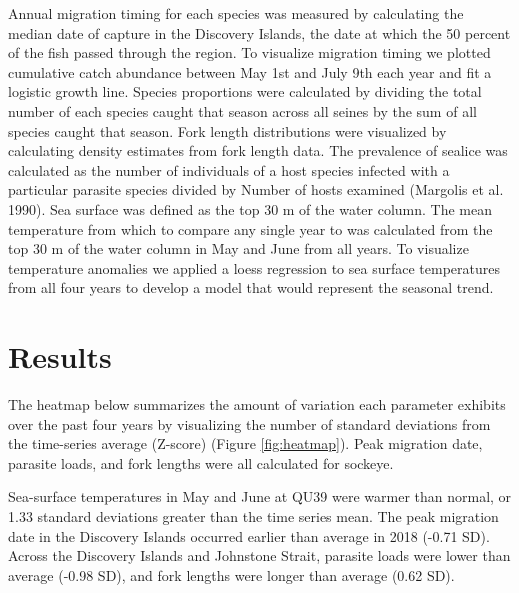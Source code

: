 \documentclass[fleqn,10pt]{wlpeerj} %
\begin{document}
Annual migration timing for each species was measured by calculating the
median date of capture in the Discovery Islands, the date at which the
50 percent of the fish passed through the region. To visualize migration
timing we plotted cumulative catch abundance between May 1st and July
9th each year and fit a logistic growth line. Species proportions were
calculated by dividing the total number of each species caught that
season across all seines by the sum of all species caught that season.
Fork length distributions were visualized by calculating density
estimates from fork length data. The prevalence of sealice was
calculated as the number of individuals of a host species infected with
a particular parasite species divided by Number of hosts examined
(Margolis et al. 1990). Sea surface was defined as the top 30 m of the
water column. The mean temperature from which to compare any single year
to was calculated from the top 30 m of the water column in May and June
from all years. To visualize temperature anomalies we applied a loess
regression to sea surface temperatures from all four years to develop a
model that would represent the seasonal trend.

\section*{Results}\label{results}

The heatmap below summarizes the amount of variation each parameter
exhibits over the past four years by visualizing the number of standard
deviations from the time-series average (Z-score) (Figure
\ref{fig:heatmap}). Peak migration date, parasite loads, and fork
lengths were all calculated for sockeye.

Sea-surface temperatures in May and June at QU39 were warmer than
normal, or 1.33 standard deviations greater than the time series mean.
The peak migration date in the Discovery Islands occurred earlier than
average in 2018 (-0.71 SD). Across the Discovery Islands and Johnstone
Strait, parasite loads were lower than average (-0.98 SD), and fork
lengths were longer than average (0.62 SD).
\end{document}
